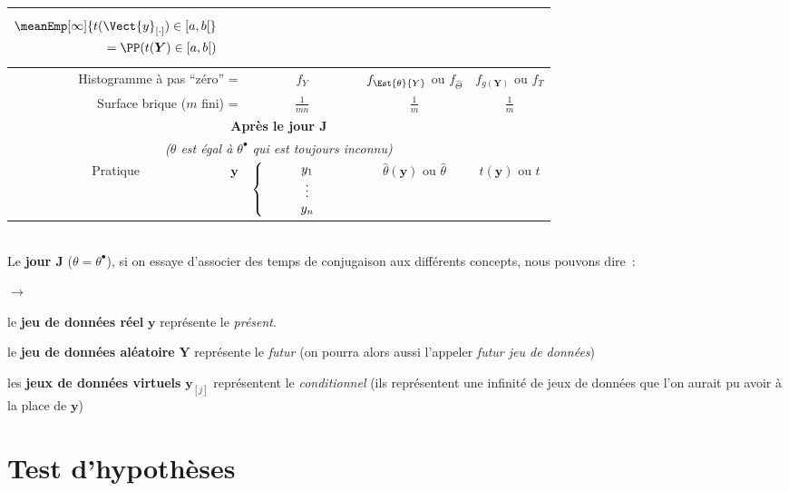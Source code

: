 \documentclass[10pt]{article}
\begin{document}
{\begin{tabular}{|c|cc|c|c|}
\begin{minipage}[c]{4cm}
\begin{eqnarray*}
\meanEmp[\infty]{t(\Vect{y}_{[\cdot]})\in [a,b[}\\
=\PP(t(\bm Y)\in[a,b[)
\end{eqnarray*} 
\end{minipage}
\\\hline
\multicolumn{2}{|r|}{Histogramme à pas ``zéro'' =} & $f_Y$ & $f_{\Est{\theta}{Y}}$ ou $f_{\widehat\Theta}$ &$f_{g(\bm Y)}$ ou $f_T$\\\hline
\multicolumn{2}{|r|}{Surface brique ($m$ fini) =} & $\frac1{mn}$ & $\frac1m$  &$\frac1m$\\\hline\hline
\multicolumn{5}{|c|}{\textbf{Après le jour J}}\\
\multicolumn{5}{|c|}{\textit{($\theta$ est égal à $\theta^\bullet$ qui est toujours inconnu)}}\\\hline
Pratique &  $\bm{y}$ &  \begin{minipage}[c]{2cm}
$\left\{
\begin{array}{c}
y_{1}\\
\phantom{\hspace*{1cm}}\vdots\phantom{\hspace*{1cm}}\\
y_{n}
\end{array}
\right.$
\end{minipage}
 & $\widehat{\theta}(\bm{y})$ ou $\widehat\theta$ & $t( \bm{y})$ ou $t$\\\hline
\end{tabular}
}\\
Le \textbf{jour J} ($\theta=\theta^\bullet$), si on essaye d'associer des temps de conjugaison aux différents concepts, nous pouvons dire~:
\begin{list}{$\to$}{}
\item le \textbf{jeu de données réel} ${\bm y}$ représente le \textit{présent}.
\item le \textbf{jeu de données aléatoire} ${\bm Y}$ représente le \textit{futur} (on pourra alors aussi l'appeler \textit{futur jeu de données})
\item les \textbf{jeux de données virtuels} ${\bm y}_{[j]}$ représentent le \textit{conditionnel} (ils représentent une infinité de jeux de données que l'on aurait pu avoir à la place de $\bm y$) 
\end{list}



\newpage

\section{Test d'hypoth{\`e}ses}\label{sec-gen-hypo}
\end{document}
